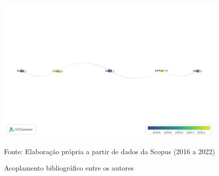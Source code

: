 \begin{figure}[H]
	\centering
	\caption{Acoplamento bibliográfico entre os autores}
	\label{fig:autores}
	\includegraphics[width=1\linewidth]{Revisao/Figuras/Autores}
	
	\vspace{0.2cm}
	Fonte: Elaboração própria a partir de dados da Scopus (2016 a 2022)
\end{figure}